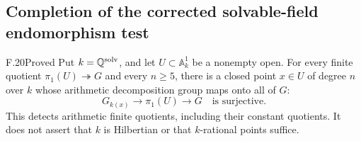 \subsection{Completion of the corrected solvable-field endomorphism test}

\begin{claim}{F.20}{Proved}
Put $k=\mathbb Q^{\mathrm{solv}}$, and let
$U\subset\mathbb A^1_k$ be a nonempty open. For every finite
quotient $\pi_1(U)\twoheadrightarrow G$ and every $n\ge5$, there
is a closed point $x\in U$ of degree $n$ over $k$ whose
arithmetic decomposition group maps onto all of $G$:
\[
 G_{k(x)}\longrightarrow\pi_1(U)\longrightarrow G
 \quad\text{is surjective}.
\]
This detects arithmetic finite quotients, including their constant
quotients. It does not assert that $k$ is Hilbertian or that
$k$-rational points suffice.
\end{claim}
